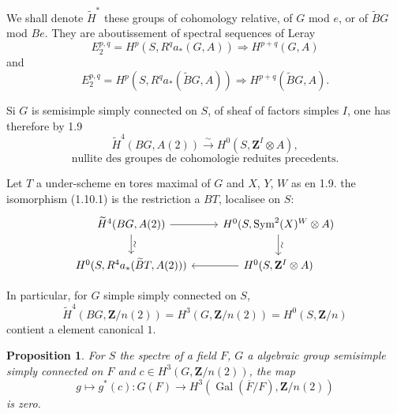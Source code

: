 \documentclass[11pt,a4paper]{article}
\theoremstyle{plain}
\newtheorem{proposition}[theorem]{Proposition}
\theoremstyle{definition}
\DeclareMathOperator{\Sym}{Sym}
\DeclareMathOperator{\Gal}{Gal}
\begin{document}
We shall denote $\widetilde{H}^*$ these groups of cohomology relative, of $G$ mod $e$, or of $\widetilde{B}G$ mod $Be$. They are aboutissement of spectral sequences of Leray
\[
E_2^{p,q} = H^p(S, R^q a_*(G, A)) \Rightarrow H^{p+q}(G, A)
\]
and
\[
E_2^{p,q} = H^p(S, R^q a_*(\widetilde{B}G, A)) \Rightarrow H^{p+q}(\widetilde{B}G, A).
\]

Si $G$ is semisimple simply connected on $S$, of sheaf of factors simples $I$, one has therefore by 1.9
\begin{equation}\label{1.10.1}
\widetilde{H}^4(BG, A(2)) \xrightarrow{\sim} H^0(S, \mathbf{Z}^I \otimes A),
\end{equation}
\begin{equation}\label{1.10.2}
\text{nullite des groupes de cohomologie reduites precedents.}
\end{equation}

Let $T$ a under-scheme en tores maximal of $G$ and $X$, $Y$, $W$ as en 1.9. the isomorphism (1.10.1) is the restriction a $BT$, localisee on $S$:
\begin{equation}\label{1.10.3}
\begin{tikzcd}
\widetilde{H}^4(BG, A(2)) \arrow{r} \arrow{d}{\rotatebox{90}{$\sim$}} & H^0(S, \Sym^2(X)^W \otimes A) \arrow{d}{\rotatebox{90}{$\sim$}} \\
H^0(S, R^4 a_*(\widetilde{B}T, A(2))) & H^0(S, \mathbf{Z}^I \otimes A) \arrow{l}
\end{tikzcd}
\end{equation}

In particular, for $G$ simple simply connected on $S$,
\begin{equation}\label{1.10.4}
\widetilde{H}^4(BG, \mathbf{Z}/n(2)) = H^3(G, \mathbf{Z}/n(2)) = H^0(S, \mathbf{Z}/n)
\end{equation}
contient a element canonical $1$.

\begin{proposition}\label{1.11}
For $S$ the spectre of a field $F$, $G$ a algebraic group semisimple simply connected on $F$ and $c \in H^3(G, \mathbf{Z}/n(2))$, the map
\begin{equation}\label{1.11.1}
g \mapsto g^*(c) : G(F) \to H^3(\Gal(\overline{F}/F), \mathbf{Z}/n(2))
\end{equation}
is zero.
\end{proposition}
\end{document}
